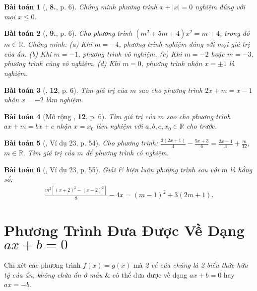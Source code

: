 \documentclass{article}
\numberwithin{equation}{section}
\newtheorem{baitoan}{Bài toán}
\begin{document}
\begin{baitoan}[\cite{SBT_Toan_8_tap_2}, \textbf{8.}, p. 6]
	Chứng minh phương trình $x + |x| = 0$ nghiệm đúng với mọi $x\le0$.
\end{baitoan}

\begin{baitoan}[\cite{SBT_Toan_8_tap_2}, \textbf{9.}, p. 6]
	Cho phương trình $(m^2 + 5m + 4)x^2 = m + 4$, trong đó $m\in\mathbb{R}$. Chứng minh: (a) Khi $m = -4$, phương trình nghiệm đúng với mọi giá trị của ẩn. (b) Khi $m = -1$, phương trình vô nghiệm. (c) Khi $m = -2$ hoặc $m = -3$, phương trình cũng vô nghiệm. (d) Khi $m = 0$, phương trình nhận $x = \pm1$ là nghiệm.
\end{baitoan}

\begin{baitoan}[\cite{SBT_Toan_8_tap_2}, \textbf{12}, p. 6]
	Tìm giá trị của $m$ sao cho phương trình $2x + m = x - 1$ nhận $x = -2$ làm nghiệm.
\end{baitoan}

\begin{baitoan}[Mở rộng \cite{SBT_Toan_8_tap_2}, \textbf{12}, p. 6]
	Tìm giá trị của $m$ sao cho phương trình $ax + m = bx + c$ nhận $x = x_0$ làm nghiệm với $a,b,c,x_0\in\mathbb{R}$ cho trước.
\end{baitoan}

\begin{baitoan}[\cite{Tuyen_Toan_8}, Ví dụ 23, p. 54]
	Cho phương trình: $\frac{3(2x + 1)}{4} - \frac{5x + 3}{6} = \frac{2x - 1}{3} + \frac{m}{12}$, $m\in\mathbb{R}$. Tìm giá trị của $m$ để phương trình có nghiệm.
\end{baitoan}

\begin{baitoan}[\cite{Tuyen_Toan_8}, Ví dụ 23, p. 55]
	Giải \& biện luận phương trình sau với $m$ là hằng số:
	\begin{align*}
		\frac{m^2[(x + 2)^2 - (x - 2)^2]}{8} - 4x = (m - 1)^2 + 3(2m + 1).
	\end{align*}
\end{baitoan}


\section{Phương Trình Đưa Được Về Dạng $ax + b = 0$}
Chỉ xét các phương trình $f(x) = g(x)$ mà \textit{2 vế của chúng là 2 biểu thức hữu tỷ của ẩn, không chứa ẩn ở mẫu} \& có thể đưa được về dạng $ax + b = 0$ hay $ax = -b$.
\end{document}
